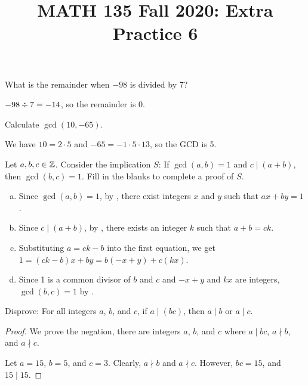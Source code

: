 
\title{MATH 135 Fall 2020: Extra Practice 6}


\thispagestyle{firstpage}

\textbf{\@title}


\question What is the remainder when $-98$ is divided by 7?

$-98 \divisionsymbol 7 = -14$, so the remainder is 0.

\question Calculate $\gcd(10,-65)$.

We have $10 = 2 \cdot 5$ and $-65 = -1 \cdot 5 \cdot 13$, so the GCD is 5.

\question Let $a,b,c\in\mathbb{Z}$. Consider the implication $S$:
If $\gcd(a,b)=1$ and $c \mid (a+b)$, then $\gcd(b,c)=1$.
Fill in the blanks to complete a proof of $S$.
\begin{enumerate}[(a)]
  \setlength{\parskip}{0ex}
  \item Since $\gcd(a,b)=1$, by ,
        there exist integers $x$ and $y$ such that $ax+by=1$.
  \item Since $c \mid (a+b)$, by ,
        there exists an integer $k$ such that $a+b=ck$.
  \item Substituting $a=ck-b$ into the first equation, we get $1=(ck-b)x+by=b(-x+y)+c(kx)$.
  \item Since 1 is a common divisor of $b$ and $c$ and $-x+y$ and $kx$ are integers,
        $\gcd(b,c)=1$ by .
\end{enumerate}

\question Disprove: For all integers $a$, $b$, and $c$, if $a \mid (bc)$, then $a \mid b$ or $a \mid c$.
\begin{proof}
  We prove the negation, there are integers $a$, $b$, and $c$ where
  $a \mid bc$, $a \nmid b$, and $a \nmid c$.

  Let $a=15$, $b=5$, and $c=3$.
  Clearly, $a \nmid b$ and $a \nmid c$.
  However, $bc=15$, and $15 \mid 15$.
\end{proof}



